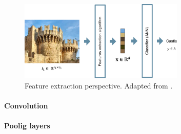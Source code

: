 \begin{figure}
    \centering
    \includegraphics[width=0.7\textwidth]{Images/featureextraction.png}
    \caption[Feature extraction perspective.]{Feature extraction perspective. Adapted from \cite{giacomo_boracchi_convolutional_2021}.}
    \label{fig:cazzle}
\end{figure}

\paragraph{Convolution}
\paragraph{Poolig layers}